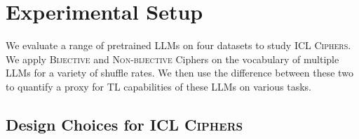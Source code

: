 \documentclass[11pt]{article}
\newcounter{nTheorems}
\newtheorem{theorem}[nTheorems]{Theorem}
\newcounter{nAssumptions}
\newtheorem{assumption}[nAssumptions]{Assumption}
\newcommand{\aayush}[1]{{\color{green}[{\bf Aayush}: #1]}}
\newcommand{\name}{\textsc{ICL Ciphers}}
\begin{document}




\section{Experimental Setup}
\label{sec:setup}
We evaluate a range of pretrained LLMs on four datasets to study \name.
We apply \textsc{Bijective} and \textsc{Non-bijective} Ciphers on the vocabulary of multiple LLMs for a variety of shuffle rates.
We then use the difference between these two to quantify a proxy for TL capabilities of these LLMs on various tasks.




\subsection{Design Choices for \name}
\label{subsec:empirical}
\end{document}
